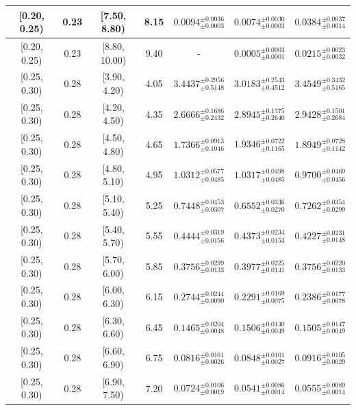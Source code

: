 \begin{longtable}{|c|c|c|c|c|c|c|}
\hline
[0.20, 0.25) & 0.23 & [7.50, 8.80) & 8.15 & $0.0094^{ \pm 0.0036 }_{ \pm 0.0003 }$ & $0.0074^{ \pm 0.0030 }_{ \pm 0.0003 }$ & $0.0384^{ \pm 0.0037 }_{ \pm 0.0014 }$ \\ 
\hline
[0.20, 0.25) & 0.23 & [8.80, 10.00) & 9.40 & - & $0.0005^{ \pm 0.0003 }_{ \pm 0.0001 }$ & $0.0215^{ \pm 0.0023 }_{ \pm 0.0032 }$ \\ 
\hline
[0.25, 0.30) & 0.28 & [3.90, 4.20) & 4.05 & $3.4437^{ \pm 0.2956 }_{ \pm 0.5148 }$ & $3.0183^{ \pm 0.2543 }_{ \pm 0.4512 }$ & $3.4549^{ \pm 0.3432 }_{ \pm 0.5165 }$ \\ 
\hline
[0.25, 0.30) & 0.28 & [4.20, 4.50) & 4.35 & $2.6666^{ \pm 0.1686 }_{ \pm 0.2432 }$ & $2.8945^{ \pm 0.1375 }_{ \pm 0.2640 }$ & $2.9428^{ \pm 0.1501 }_{ \pm 0.2684 }$ \\ 
\hline
[0.25, 0.30) & 0.28 & [4.50, 4.80) & 4.65 & $1.7366^{ \pm 0.0913 }_{ \pm 0.1046 }$ & $1.9346^{ \pm 0.0722 }_{ \pm 0.1165 }$ & $1.8949^{ \pm 0.0728 }_{ \pm 0.1142 }$ \\ 
\hline
[0.25, 0.30) & 0.28 & [4.80, 5.10) & 4.95 & $1.0312^{ \pm 0.0577 }_{ \pm 0.0485 }$ & $1.0317^{ \pm 0.0498 }_{ \pm 0.0485 }$ & $0.9700^{ \pm 0.0469 }_{ \pm 0.0456 }$ \\ 
\hline
[0.25, 0.30) & 0.28 & [5.10, 5.40) & 5.25 & $0.7448^{ \pm 0.0453 }_{ \pm 0.0307 }$ & $0.6552^{ \pm 0.0336 }_{ \pm 0.0270 }$ & $0.7262^{ \pm 0.0354 }_{ \pm 0.0299 }$ \\ 
\hline
[0.25, 0.30) & 0.28 & [5.40, 5.70) & 5.55 & $0.4444^{ \pm 0.0319 }_{ \pm 0.0156 }$ & $0.4373^{ \pm 0.0234 }_{ \pm 0.0153 }$ & $0.4227^{ \pm 0.0231 }_{ \pm 0.0148 }$ \\ 
\hline
[0.25, 0.30) & 0.28 & [5.70, 6.00) & 5.85 & $0.3756^{ \pm 0.0299 }_{ \pm 0.0133 }$ & $0.3977^{ \pm 0.0225 }_{ \pm 0.0141 }$ & $0.3756^{ \pm 0.0220 }_{ \pm 0.0133 }$ \\ 
\hline
[0.25, 0.30) & 0.28 & [6.00, 6.30) & 6.15 & $0.2744^{ \pm 0.0244 }_{ \pm 0.0090 }$ & $0.2291^{ \pm 0.0169 }_{ \pm 0.0075 }$ & $0.2386^{ \pm 0.0177 }_{ \pm 0.0078 }$ \\ 
\hline
[0.25, 0.30) & 0.28 & [6.30, 6.60) & 6.45 & $0.1465^{ \pm 0.0204 }_{ \pm 0.0048 }$ & $0.1506^{ \pm 0.0140 }_{ \pm 0.0049 }$ & $0.1505^{ \pm 0.0147 }_{ \pm 0.0049 }$ \\ 
\hline
[0.25, 0.30) & 0.28 & [6.60, 6.90) & 6.75 & $0.0816^{ \pm 0.0161 }_{ \pm 0.0026 }$ & $0.0848^{ \pm 0.0101 }_{ \pm 0.0027 }$ & $0.0916^{ \pm 0.0105 }_{ \pm 0.0029 }$ \\ 
\hline
[0.25, 0.30) & 0.28 & [6.90, 7.50) & 7.20 & $0.0724^{ \pm 0.0106 }_{ \pm 0.0019 }$ & $0.0541^{ \pm 0.0086 }_{ \pm 0.0014 }$ & $0.0555^{ \pm 0.0089 }_{ \pm 0.0014 }$ \\ 

\end{longtable}
